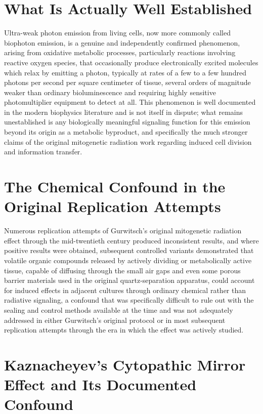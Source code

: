 \documentclass[11pt]{article}
\begin{document}
\section{What Is Actually Well Established}

Ultra-weak photon emission from living cells, now more commonly called biophoton emission, is a genuine and independently confirmed phenomenon, arising from oxidative metabolic processes, particularly reactions involving reactive oxygen species, that occasionally produce electronically excited molecules which relax by emitting a photon, typically at rates of a few to a few hundred photons per second per square centimeter of tissue, several orders of magnitude weaker than ordinary bioluminescence and requiring highly sensitive photomultiplier equipment to detect at all. This phenomenon is well documented in the modern biophysics literature and is not itself in dispute; what remains unestablished is any biologically meaningful signaling function for this emission beyond its origin as a metabolic byproduct, and specifically the much stronger claims of the original mitogenetic radiation work regarding induced cell division and information transfer.

\section{The Chemical Confound in the Original Replication Attempts}

Numerous replication attempts of Gurwitsch's original mitogenetic radiation effect through the mid-twentieth century produced inconsistent results, and where positive results were obtained, subsequent controlled variants demonstrated that volatile organic compounds released by actively dividing or metabolically active tissue, capable of diffusing through the small air gaps and even some porous barrier materials used in the original quartz-separation apparatus, could account for induced effects in adjacent cultures through ordinary chemical rather than radiative signaling, a confound that was specifically difficult to rule out with the sealing and control methods available at the time and was not adequately addressed in either Gurwitsch's original protocol or in most subsequent replication attempts through the era in which the effect was actively studied.

\section{Kaznacheyev's Cytopathic Mirror Effect and Its Documented Confound}
\end{document}
